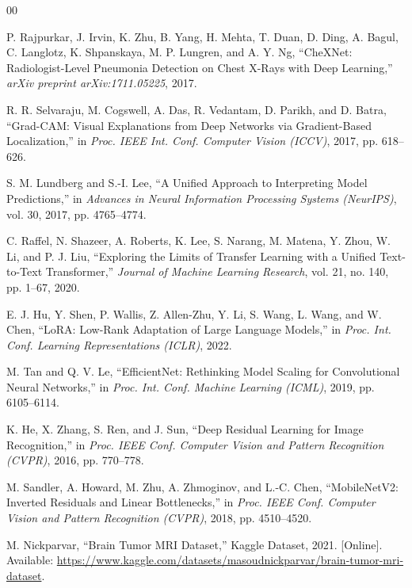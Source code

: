 \documentclass[conference]{IEEEtran}
\begin{document}
\begin{thebibliography}{00}

 P. Rajpurkar, J. Irvin, K. Zhu, B. Yang, H. Mehta, T. Duan, D. Ding, A. Bagul, C. Langlotz, K. Shpanskaya, M. P. Lungren, and A. Y. Ng, ``CheXNet: Radiologist-Level Pneumonia Detection on Chest X-Rays with Deep Learning,'' \emph{arXiv preprint arXiv:1711.05225}, 2017.

 R. R. Selvaraju, M. Cogswell, A. Das, R. Vedantam, D. Parikh, and D. Batra, ``Grad-CAM: Visual Explanations from Deep Networks via Gradient-Based Localization,'' in \emph{Proc. IEEE Int. Conf. Computer Vision (ICCV)}, 2017, pp. 618--626.

 S. M. Lundberg and S.-I. Lee, ``A Unified Approach to Interpreting Model Predictions,'' in \emph{Advances in Neural Information Processing Systems (NeurIPS)}, vol. 30, 2017, pp. 4765--4774.

 C. Raffel, N. Shazeer, A. Roberts, K. Lee, S. Narang, M. Matena, Y. Zhou, W. Li, and P. J. Liu, ``Exploring the Limits of Transfer Learning with a Unified Text-to-Text Transformer,'' \emph{Journal of Machine Learning Research}, vol. 21, no. 140, pp. 1--67, 2020.

 E. J. Hu, Y. Shen, P. Wallis, Z. Allen-Zhu, Y. Li, S. Wang, L. Wang, and W. Chen, ``LoRA: Low-Rank Adaptation of Large Language Models,'' in \emph{Proc. Int. Conf. Learning Representations (ICLR)}, 2022.

 M. Tan and Q. V. Le, ``EfficientNet: Rethinking Model Scaling for Convolutional Neural Networks,'' in \emph{Proc. Int. Conf. Machine Learning (ICML)}, 2019, pp. 6105--6114.

 K. He, X. Zhang, S. Ren, and J. Sun, ``Deep Residual Learning for Image Recognition,'' in \emph{Proc. IEEE Conf. Computer Vision and Pattern Recognition (CVPR)}, 2016, pp. 770--778.

 M. Sandler, A. Howard, M. Zhu, A. Zhmoginov, and L.-C. Chen, ``MobileNetV2: Inverted Residuals and Linear Bottlenecks,'' in \emph{Proc. IEEE Conf. Computer Vision and Pattern Recognition (CVPR)}, 2018, pp. 4510--4520.

 M. Nickparvar, ``Brain Tumor MRI Dataset,'' Kaggle Dataset, 2021. [Online]. Available: \url{https://www.kaggle.com/datasets/masoudnickparvar/brain-tumor-mri-dataset}.


\end{thebibliography}
\end{document}
